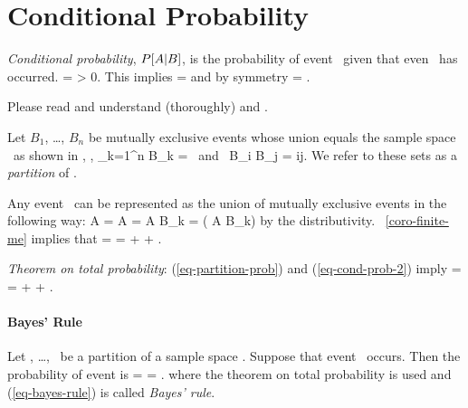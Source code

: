 \eit


\section{Conditional Probability}

\bit
	\item \emph{Conditional probability},
	$P[A|B]$,
	is the probability of event \sA\ given that even \sB\ has occurred.
		 = 
		\mfor
		 > 0.
	\eeql
	This implies
		 =  
	\eeql
	and by symmetry
		 =  .
	\eeql


	\item Please read and understand (thoroughly)  and .

	\item {}


	\item Let $B_1$, \ldots, $B_n$ be mutually exclusive events whose
	union equals the sample space \sspace\ as shown in ,
	\ie,
		\bigcup_{k=1}^n B_k = \sspace
		\mbox{ and }
		B_i \cap B_j = \emptyset
		\mforall
		i\neq j.
	\eeql
	We refer to these sets as a \emph{partition} of \sspace.

	\item Any event \sA\ can be represented as the union
	of mutually exclusive events in the following way:
	\beq
		A = A \cap \sspace
		= A \cap \bigcupkton B_k
		= \bigcupkton ( A \cap B_k)
	\eeq
	by the distributivity.
	\corollaryname~\ref{coro-finite-me}
	implies that
		 = \sumkton {}
		=  + \cdots + .
	\eeql

	\item \emph{Theorem on total probability}:
	(\ref{eq-partition-prob}) and (\ref{eq-cond-prob-2})
	imply
		 = \sumkton {}
		=  + \cdots + .
	\eeql

	\item {}
\eit

\paragraph{Bayes' Rule}

\bit
	\item
	Let , \ldots, \ be a partition of a sample space \sspace.
	Suppose that event \sA\ occurs.
	Then the probability of event  is
		= 
		= 
			{ \sumkton {}}.
	\eeql
	where the theorem on total probability is used
	and (\ref{eq-bayes-rule}) is called \emph{Bayes' rule}.

